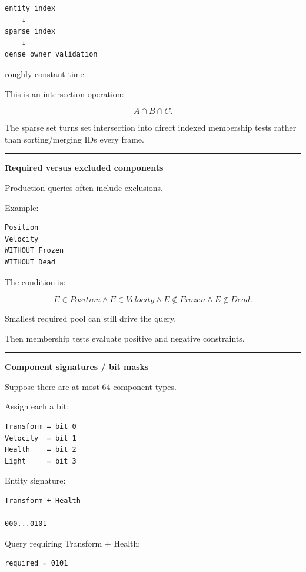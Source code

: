 \begin{verbatim}
entity index
    ↓
sparse index
    ↓
dense owner validation
\end{verbatim}

roughly constant-time.

This is an intersection operation:

\[
A\cap B\cap C.
\]

The sparse set turns set intersection into direct indexed membership tests rather than sorting/merging IDs every frame.

\begin{center}\rule{0.5\linewidth}{0.5pt}\end{center}

\textbf{Required versus excluded components}

Production queries often include exclusions.

Example:

\begin{verbatim}
Position
Velocity
WITHOUT Frozen
WITHOUT Dead
\end{verbatim}

The condition is:

\[
E\in Position
\land
E\in Velocity
\land
E\notin Frozen
\land
E\notin Dead.
\]

Smallest required pool can still drive the query.

Then membership tests evaluate positive and negative constraints.

\begin{center}\rule{0.5\linewidth}{0.5pt}\end{center}

\textbf{Component signatures / bit masks}

Suppose there are at most 64 component types.

Assign each a bit:

\begin{verbatim}
Transform = bit 0
Velocity  = bit 1
Health    = bit 2
Light     = bit 3
\end{verbatim}

Entity signature:

\begin{verbatim}
Transform + Health

000...0101
\end{verbatim}

Query requiring Transform + Health:

\begin{verbatim}
required = 0101
\end{verbatim}

